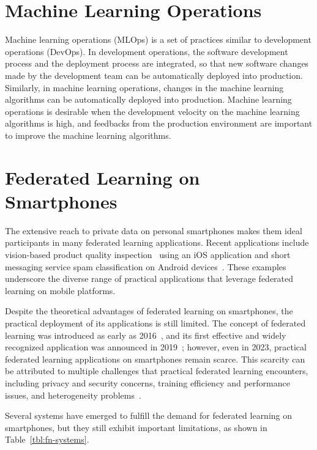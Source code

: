\section{Machine Learning Operations}

Machine learning operations (MLOps) is a set of practices similar to
development operations (DevOps).
In development operations,
the software development process and the deployment process are integrated,
so that new software changes made by the development team can be
automatically deployed into production.
Similarly, in machine learning operations,
changes in the machine learning algorithms can be automatically deployed into
production.
Machine learning operations is desirable when the development velocity on
the machine learning algorithms is high,
and feedbacks from the production environment are important to improve
the machine learning algorithms.

\section{Federated Learning on Smartphones}

The extensive reach to private data on personal smartphones makes them ideal
participants in many federated learning applications.
Recent applications include vision-based product quality
inspection~\cite{bharti2022edge}
using an iOS application and short messaging service spam classification on Android
devices~\cite{sriraman2022device}.
These examples underscore the diverse range of practical applications that
leverage federated learning on mobile platforms.

Despite the theoretical advantages of federated learning on smartphones,
the practical deployment of its applications is still limited.
The concept of federated learning was introduced as early as
2016~\cite{mcmahan2017communication},
and its first effective and widely recognized application was announced in
2019~\cite{bonawitz2019towards}; however, even in 2023,
practical federated learning applications on smartphones remain scarce.
This scarcity can be attributed to multiple challenges that practical federated
learning encounters, including privacy and security concerns,
training efficiency and performance issues,
and heterogeneity problems~\cite{wen2023survey}.

Several systems have emerged to fulfill the demand for federated learning
on smartphones, but they still exhibit important limitations,
as shown in Table~\ref{tbl:fn-systems}.

